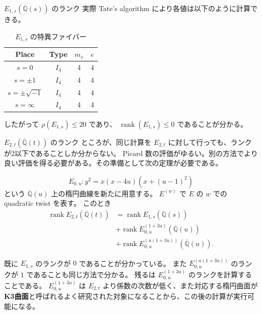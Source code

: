 \documentclass{classes/mybeamer}
\DeclareMathOperator{\rank}{rank}
\begin{document}
\begin{frame}{$E_{1,s}(\overline{\mathbb{Q}}(s))$ のランク}
    実際 Tate's algorithm により各値は以下のように計算できる。
    \begin{table}[htbp]
        \centering
        \caption{$E_{1,s}$ の特異ファイバー}
        \begin{tabular}{|c|c|c|c|}
            \hline
            Place             & Type  & $m_v$ & $e$ \\
            \hline
            $s=0$             & $I_4$ & 4     & 4   \\
            $s=\pm 1$         & $I_4$ & 4     & 4   \\
            $s=\pm \sqrt{-1}$ & $I_4$ & 4     & 4   \\
            $s=\infty$        & $I_4$ & 4     & 4   \\
            \hline
        \end{tabular}
    \end{table}
    したがって $\rho(E_{1,s}) \leq 20$ であり、 $\rank(E_{1,s}) \leq 0$ であることが分かる。
\end{frame}

\begin{frame}{$E_{2,t}(\overline{\mathbb{Q}}(t))$ のランク}
    ところが、同じ計算を $E_{2,t}$ に対して行っても、ランクが2以下であることしか分からない。
    Picard 数の評価がゆるい。別の方法でより良い評価を得る必要がある。その準備として次の定理が必要である。
    \begin{thm}[Y.]
        \begin{equation*}
            E_{0,u}: y^{2} = x(x - 4u)(x + (u - 1)^{2})
        \end{equation*}
        という $\overline{\mathbb{Q}}(u)$ 上の楕円曲線を新たに用意する。
        $E^{(w)}$ で $E$ の $w$ での quadratic twist を表す。
        このとき
        \begin{equation}
            \label{eq:rankdecomposition}
            \begin{split}
                \rank E_{2,t}(\overline{\mathbb{Q}}(t)) & = \rank E_{1,s}(\overline{\mathbb{Q}}(s))                \\
                                                        & + \rank E_{0,u}^{(1 + 3u)}(\overline{\mathbb{Q}}(u))     \\
                                                        & + \rank E_{0,u}^{(u(1 + 3u))}(\overline{\mathbb{Q}}(u)).
            \end{split}
        \end{equation}
    \end{thm}
    既に $E_{1,s}$ のランクが $0$ であることが分かっている。
    また $E_{0,u}^{(u(1 + 3u))}$ のランクが $1$ であることも同じ方法で分かる。
    残るは $E_{0,u}^{(1 + 3u)}$ のランクを計算することである。
    $E_{0,u}^{(1 + 3u)}$ は $E_{2,t}$ より係数の次数が低く、また対応する楕円曲面が\textbf{K3曲面}と呼ばれるよく研究された対象になることから、この後の計算が実行可能になる。
\end{frame}
\end{document}
